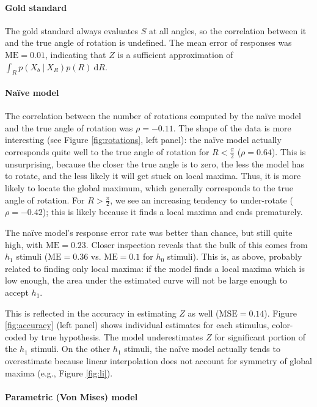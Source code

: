 \documentclass{article} %
\newcommand{\MSE}[0]{\mathrm{MSE}}
\newcommand{\ME}[0]{\mathrm{ME}}
\newcommand{\naive}[0]{na\"ive}
\newcommand{\Naive}[0]{Na\"ive}
\begin{document}
\paragraph{Gold standard} 

The gold standard always evaluates $S$ at all angles, so the
correlation between it and the true angle of rotation is
undefined. The mean error of responses was $\ME{}=0.01$, indicating
that $Z$ is a sufficient approximation of $\int_R p(X_b\ \vert\
X_R)p(R)\ \mathrm{d}R$.

\paragraph{\Naive{} model} 

The correlation between the number of rotations computed by the
\naive{} model and the true angle of rotation was $\rho=-0.11$. The
shape of the data is more interesting (see Figure \ref{fig:rotations},
left panel): the \naive{} model actually corresponds quite well to
the true angle of rotation for $R<\frac{\pi}{2}$ ($\rho=0.64$). This
is unsurprising, because the closer the true angle is to zero, the
less the model has to rotate, and the less likely it will get stuck on
local maxima. Thus, it is more likely to locate the global maximum,
which generally corresponds to the true angle of rotation. For
$R>\frac{\pi}{2}$, we see an increasing tendency to under-rotate
($\rho=-0.42$); this is likely because it finds a local maxima and
ends prematurely.

The \naive{} model's response error rate was better than chance, but
still quite high, with $\ME{}=0.23$. Closer inspection reveals that
the bulk of this comes from $h_1$ stimuli ($\ME{}=0.36$
vs. $\ME{}=0.1$ for $h_0$ stimuli). This is, as above, probably
related to finding only local maxima: if the model finds a local
maxima which is low enough, the area under the estimated curve will
not be large enough to accept $h_1$.

This is reflected in the accuracy in estimating $Z$ as well
($\MSE{}=0.14$). Figure \ref{fig:accuracy} (left panel) shows
individual estimates for each stimulus, color-coded by true
hypothesis. The model underestimates $Z$ for significant portion of
the $h_1$ stimuli. On the other $h_1$ stimuli, the \naive{} model
actually tends to overestimate because linear interpolation does not
account for symmetry of global maxima (e.g., Figure \ref{fig:li}).

\paragraph{Parametric (Von Mises) model}
\end{document}
